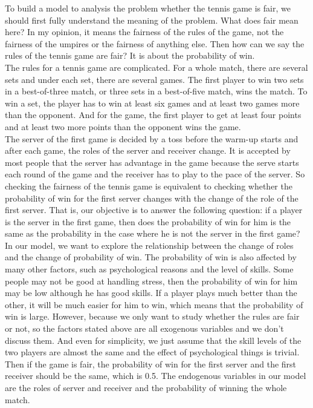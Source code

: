 \documentclass[12pt]{article}
\begin{document}
To build a model to analysis the problem whether the tennis game is fair, we should first fully understand the meaning of the problem. What does fair mean here? In my opinion, it means the fairness of the rules of the game, not the fairness of the umpires or the fairness of anything else. Then how can we say the rules of the tennis game are fair? It is about the probability of win.\\

The rules for a tennis game are complicated. For a whole match, there are several sets and under each set, there are several games. The first player to win two sets in a best-of-three match, or three sets in a best-of-five match, wins the match. To win a set, the player has to win at least six games and at least two games more than the opponent. And for the game, the first player to get at least four points and at least two more points than the opponent wins the game.\\

The server of the first game is decided by a toss before the warm-up starts and after each game, the roles of the server and receiver change. It is accepted by most people that the server has advantage in the game because the serve starts each round of the game and the receiver has to play to the pace of the server. So checking the fairness of the tennis game is equivalent to checking whether the probability of win for the first server changes with the change of the role of the first server. That is, our objective is to answer the following question: if a player is the server in the first game, then does the probability of win for him is the same as the probability in the case where he is not the server in the first game?\\

In our model, we want to explore the relationship between the change of roles and the change of probability of win. The probability of win is also affected by many other factors, such as psychological reasons and the level of skills. Some people may not be good at handling stress, then the probability of win for him may be low although he has good skills. If a player plays much better than the other, it will be much easier for him to win, which means that the probability of win is large. However, because we only want to study whether the rules are fair or not, so the factors stated above are all exogenous variables and we don't discuss them. And even for simplicity, we just assume that the skill levels of the two players are almost the same and the effect of psychological things is trivial. Then if the game is fair, the probability of win for the first server and the first receiver should be the same, which is 0.5. The endogenous variables in our model are the roles of server and receiver and the probability of winning the whole match.\\
\end{document}
